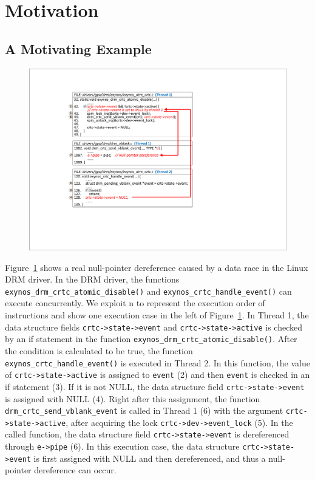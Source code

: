 \section{Motivation}
\label{sec_motivation}

\subsection{A Motivating Example}
\label{subsec_motivating_example}

\begin{figure}[htbp]
	\centering
	\includegraphics[width=1\linewidth]{figures/fig_bug_demo.pdf}
	\label{fig_bug_demo}
\end{figure}
Figure~\ref{fig_bug_demo} shows a real null-pointer dereference caused by a 
data race in the Linux DRM driver. In the DRM driver, the functions {\tt 
exynos\_drm\_crtc\_atomic\_disable()} and {\tt exynos\_crtc\_handle\_event()} 
can execute concurrently. We exploit \textcircled{\footnotesize{n}} to 
represent the execution order of instructions and show one execution case in 
the left of Figure~\ref{fig_bug_demo}. In Thread 1, the data structure fields 
{\tt crtc->state->event} and {\tt crtc->state->active} is checked by an if 
statement in the function {\tt exynos\_drm\_crtc\_atomic\_disable()}. After the 
condition is calculated to be true, the function {\tt 
exynos\_crtc\_handle\_event()} is executed in Thread 2. In this function, the 
value of {\tt crtc->state->active} is assigned to {\tt event} 
(\textcircled{\footnotesize{2}}) and then {\tt event} is checked in an if 
statement (\textcircled{\footnotesize{3}}). If it is not NULL, the data 
structure field {\tt crtc->state->event} is assigned with NULL 
(\textcircled{\footnotesize{4}}). Right after this assignment, the function 
{\tt drm\_crtc\_send\_vblank\_event} is called  in Thread 1 
(\textcircled{\footnotesize{6}}) with the argument {\tt crtc->state->active}, 
after acquiring the lock {\tt crtc->dev->event\_lock} 
(\textcircled{\footnotesize{5}}). In the called function, the data structure 
field {\tt crtc->state->event} is dereferenced through {\tt e->pipe} 
(\textcircled{\footnotesize{6}}). In this execution case, the data structure 
{\tt crtc->state->event} is first assigned with NULL and then dereferenced, and 
thus a null-pointer dereference can occur.

